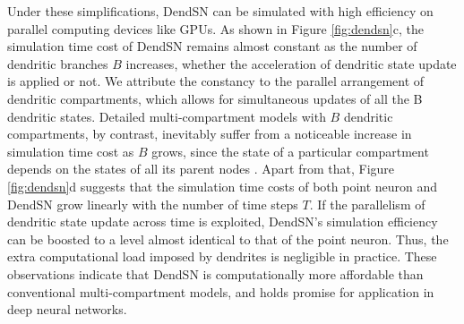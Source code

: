 Under these simplifications, DendSN can be simulated with high efficiency on parallel computing devices like GPUs. As shown in Figure \ref{fig:dendsn}c, the simulation time cost of DendSN remains almost constant as the number of dendritic branches $B$ increases, whether the acceleration of dendritic state update is applied or not. We attribute the constancy to the parallel arrangement of dendritic compartments, which allows for simultaneous updates of all the B dendritic states. Detailed multi-compartment models with $B$ dendritic compartments, by contrast, inevitably suffer from a noticeable increase in simulation time cost as $B$ grows, since the state of a particular compartment depends on the states of all its parent nodes \cite{zhang2023gpubased}. Apart from that, Figure \ref{fig:dendsn}d suggests that the simulation time costs of both point neuron and DendSN grow linearly with the number of time steps $T$. If the parallelism of dendritic state update across time is exploited, DendSN's simulation efficiency can be boosted to a level almost identical to that of the point neuron. Thus, the extra computational load imposed by dendrites is negligible in practice. These observations indicate that DendSN is computationally more affordable than conventional multi-compartment models, and holds promise for application in deep neural networks.

